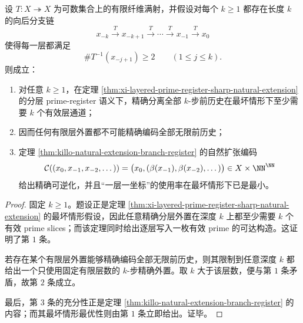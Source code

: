 \begin{theorem}\label{thm:conclusion-natural-extension-omega-layer-minimal-externalization}
设 \(T:X\twoheadrightarrow X\) 为可数集合上的有限纤维满射，并假设对每个 \(k\ge 1\) 都存在长度 \(k\) 的向后分支链
\[
x_{-k}\xrightarrow{\,T\,}x_{-k+1}\xrightarrow{\,T\,}\cdots\xrightarrow{\,T\,}x_{-1}\xrightarrow{\,T\,}x_0
\]
使得每一层都满足
\[
\#T^{-1}(x_{-j+1})\ge 2
\qquad(1\le j\le k).
\]
则成立：
\begin{enumerate}
  \item 对任意 \(k\ge 1\)，在定理 \ref{thm:xi-layered-prime-register-sharp-natural-extension} 的分层 prime-register 语义下，精确分离全部 \(k\)-步前历史在最坏情形下至少需要 \(k\) 个有效层通道；
  \item 因而任何有限层外置都不可能精确编码全部无限前历史；
  \item 定理 \ref{thm:killo-natural-extension-branch-register} 的自然扩张编码
  \[
  \mathcal C((x_0,x_{-1},x_{-2},\dots))
  =
  \bigl(x_0,(\beta(x_{-1}),\beta(x_{-2}),\dots)\bigr)\in X\times\NN^\NN
  \]
  给出精确可逆化，并且“一层一坐标”的使用率在最坏情形下已是最小。
\end{enumerate}
\end{theorem}
\begin{proof}
固定 \(k\ge 1\)。题设正是定理 \ref{thm:xi-layered-prime-register-sharp-natural-extension} 的最坏情形假设，因此任意精确分层外置在深度 \(k\) 上都至少需要 \(k\) 个有效 prime slices；而该定理同时给出逐层写入一枚有效 prime 的可达构造。这证明了第 \(1\) 条。

若存在某个有限层外置能够精确编码全部无限前历史，则其限制到任意深度 \(k\) 都给出一个只使用固定有限层数的 \(k\)-步精确外置。取 \(k\) 大于该层数，便与第 \(1\) 条矛盾，故第 \(2\) 条成立。

最后，第 \(3\) 条的充分性正是定理 \ref{thm:killo-natural-extension-branch-register} 的内容；而其最坏情形最优性则由第 \(1\) 条立即给出。证毕。
\end{proof}






